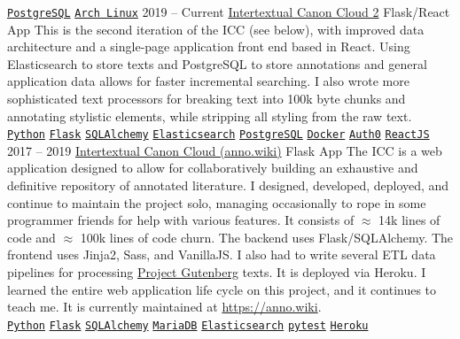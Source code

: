 \documentclass[9pt]{developercv} %
\begin{document}
\begin{entrylist}
{        \texttt{{\href{https://www.postgresql.org/}{PostgreSQL}}}\slashsep
        \texttt{{\href{https://archlinux.org/}{Arch Linux}}}
        }
    \entry
        {2019 -- Current}
        {{\href{https://github.com/Anno-Wiki}{Intertextual Canon Cloud 2}}}
        {Flask/React App}
        {
            This is the second iteration of the ICC (see below), with improved
            data architecture and a single-page application front end based in
            React.  Using Elasticsearch to store texts and PostgreSQL to store
            annotations and general application data allows for faster
            incremental searching. I also wrote more sophisticated text
            processors for breaking text into 100k byte chunks and annotating
            stylistic elements, while stripping all styling from the raw text.
        \\
        \texttt{{\href{https://www.python.org/}{Python}}}\slashsep
        \texttt{{\href{https://flask.palletsprojects.com/en/1.1.x/}{Flask}}}\slashsep
        \texttt{{\href{https://www.sqlalchemy.org/}{SQLAlchemy}}}\slashsep
        \texttt{{\href{https://www.elastic.co/}{Elasticsearch}}}\slashsep
        \texttt{{\href{https://www.postgresql.org/}{PostgreSQL}}}\slashsep
        \texttt{{\href{https://www.docker.com/}{Docker}}}\slashsep
        \texttt{{\href{https://auth0.com/}{Auth0}}}\slashsep
        \texttt{{\href{https://reactjs.org/}{ReactJS}}}
        }
    \entry
        {2017 -- 2019}
        {{\href{https://github.com/Anno-Wiki/icc}{Intertextual Canon Cloud (anno.wiki)}}}
        {Flask App}
        {
            The ICC is a web application designed to allow for collaboratively
            building an exhaustive and definitive repository of annotated
            literature. I designed, developed, deployed, and continue to
            maintain the project solo, managing occasionally to rope in some
            programmer friends for help with various features. It consists of
            $\approx$ 14k lines of code and $\approx$ 100k lines of code churn.
            The backend uses Flask/SQLAlchemy. The frontend uses Jinja2, Sass,
            and VanillaJS. I also had to write several ETL data pipelines for
            processing {\href{https://gutenberg.org}{Project Gutenberg}} texts.
            It is deployed via Heroku. I learned the entire web application life
            cycle on this project, and it continues to teach me. It is currently
            maintained at {\href{https://anno.wiki}{https://anno.wiki}}.
        \\
        \texttt{{\href{https://www.python.org/}{Python}}}\slashsep
        \texttt{{\href{https://flask.palletsprojects.com/en/1.1.x/}{Flask}}}\slashsep
        \texttt{{\href{https://www.sqlalchemy.org/}{SQLAlchemy}}}\slashsep
        \texttt{{\href{https://mariadb.org/}{MariaDB}}}\slashsep
        \texttt{{\href{https://www.elastic.co/}{Elasticsearch}}}\slashsep
        \texttt{{\href{https://docs.pytest.org/en/stable/}{pytest}}}\slashsep
        \texttt{{\href{https://www.heroku.com/}{Heroku}}}
        }
\end{entrylist}
\end{document}
